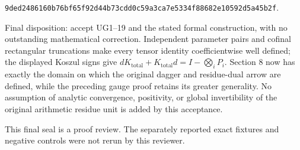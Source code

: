 \documentclass{article}
\begin{document}
\nolinkurl{9ded2486160b76bf65f92d44b73cdd0c59a3ca7e5334f88682e10592d5a45b2f}.

Final disposition: accept UG1--19 and the stated formal construction, with no outstanding mathematical correction. Independent parameter pairs and cofinal rectangular truncations make every tensor identity coefficientwise well defined; the displayed Koszul signs give \(dK_{\mathrm{total}}+K_{\mathrm{total}}d=I-\bigotimes_i P_i\). Section 8 now has exactly the domain on which the original dagger and residue-dual arrow are defined, while the preceding gauge proof retains its greater generality. No assumption of analytic convergence, positivity, or global invertibility of the original arithmetic residue unit is added by this acceptance.

This final seal is a proof review. The separately reported exact fixtures and negative controls were not rerun by this reviewer.

\endgroup
\end{document}
